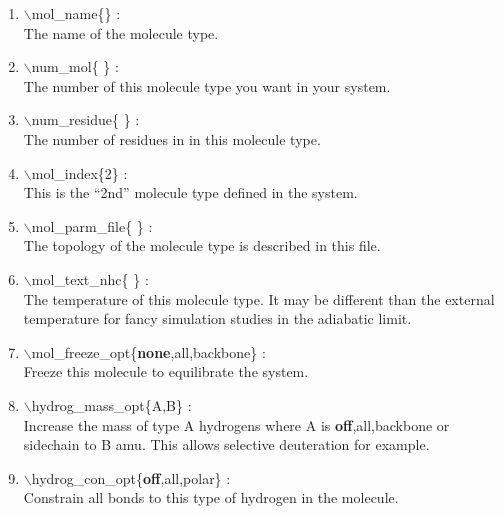 \documentclass[12pt,titlepage]{article}
\begin{document}
\begin{enumerate}

 \vspace{0.15in} 
 \item  $\backslash$mol\_name\{\} : \\
   The name of the molecule type.

 \vspace{0.15in} 
 \item  $\backslash$num\_mol\{ \} : \\ 
   The number of this molecule type you want in your system.

 \vspace{0.15in} 
 \item  $\backslash$num\_residue\{ \} : \\
   The number of residues in in this molecule type.

 \vspace{0.15in} 
 \item  $\backslash$mol\_index\{2\} : \\ 
   This is the ``2nd'' molecule type defined in the system.

 \vspace{0.15in} 
 \item  $\backslash$mol\_parm\_file\{ \} : \\
   The topology of the molecule type is described in this file.

 \vspace{0.15in} 
 \item  $\backslash$mol\_text\_nhc\{ \} : \\
   The temperature of this molecule type. It may be different than the
   external temperature for fancy simulation studies in the adiabatic limit.

 \vspace{0.15in} 
 \item  $\backslash$mol\_freeze\_opt\{{\bf none},all,backbone\} : \\
    Freeze this molecule to equilibrate the system.

 \vspace{0.15in} 
 \item  $\backslash$hydrog\_mass\_opt\{A,B\} : \\
   Increase the mass of type A hydrogens where A is 
   {\bf off},all,backbone or sidechain to B amu. This allows
   selective deuteration for example.

 \vspace{0.15in} 
 \item  $\backslash$hydrog\_con\_opt\{{\bf off},all,polar\} : \\
   Constrain all bonds to this type of hydrogen in the molecule.


\end{enumerate}
\end{document}
